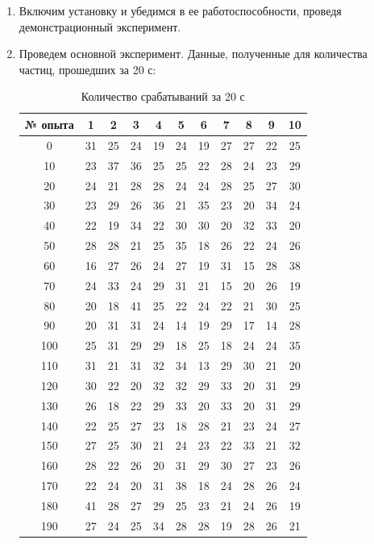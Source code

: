 \documentclass[a4paper, 12pt]{article}
\begin{document}
	\begin{enumerate}
		\item Включим установку и убедимся в ее работоспособности, проведя демонстрационный
		эксперимент.
		\item Проведем основной эксперимент. Данные, полученные для количества частиц,
		прошедших за 20 с:
		\begin{table}[H]
			\centering
			\caption{Количество срабатываний за 20 с}
			\begin{tabular}{|c|c|c|c|c|c|c|c|c|c|c|}
			\hline
			№ опыта & 1  & 2  & 3  & 4  & 5  & 6  & 7  & 8  & 9  & 10 \\ \hline
			0       & 31 & 25 & 24 & 19 & 24 & 19 & 27 & 27 & 22 & 25 \\ \hline
			10      & 23 & 37 & 36 & 25 & 25 & 22 & 28 & 24 & 23 & 29 \\ \hline
			20      & 24 & 21 & 28 & 28 & 24 & 24 & 28 & 25 & 27 & 30 \\ \hline
			30      & 23 & 29 & 26 & 36 & 21 & 35 & 23 & 20 & 34 & 24 \\ \hline
			40      & 22 & 19 & 34 & 22 & 30 & 30 & 20 & 32 & 33 & 20 \\ \hline
			50      & 28 & 28 & 21 & 25 & 35 & 18 & 26 & 22 & 24 & 26 \\ \hline
			60      & 16 & 27 & 26 & 24 & 27 & 19 & 31 & 15 & 28 & 38 \\ \hline
			70      & 24 & 33 & 24 & 29 & 31 & 21 & 15 & 20 & 26 & 19 \\ \hline
			80      & 20 & 18 & 41 & 25 & 22 & 24 & 22 & 21 & 30 & 25 \\ \hline
			90      & 20 & 31 & 31 & 24 & 14 & 19 & 29 & 17 & 14 & 28 \\ \hline
			100     & 25 & 31 & 29 & 29 & 18 & 25 & 18 & 24 & 24 & 35 \\ \hline
			110     & 31 & 21 & 31 & 32 & 34 & 13 & 29 & 30 & 21 & 20 \\ \hline
			120     & 30 & 22 & 20 & 32 & 32 & 29 & 33 & 20 & 31 & 29 \\ \hline
			130     & 26 & 18 & 22 & 29 & 33 & 20 & 33 & 20 & 31 & 29 \\ \hline
			140     & 22 & 25 & 27 & 23 & 18 & 28 & 21 & 23 & 24 & 27 \\ \hline
			150     & 27 & 25 & 30 & 21 & 24 & 23 & 22 & 33 & 21 & 32 \\ \hline
			160     & 28 & 22 & 26 & 20 & 31 & 29 & 30 & 27 & 23 & 26 \\ \hline
			170     & 22 & 24 & 20 & 31 & 38 & 18 & 24 & 28 & 26 & 24 \\ \hline
			180     & 41 & 28 & 27 & 29 & 25 & 23 & 21 & 24 & 26 & 19 \\ \hline
			190     & 27 & 24 & 25 & 34 & 28 & 28 & 19 & 28 & 26 & 21 \\ \hline
			\end{tabular}
		\end{table}


\end{enumerate}
\end{document}
